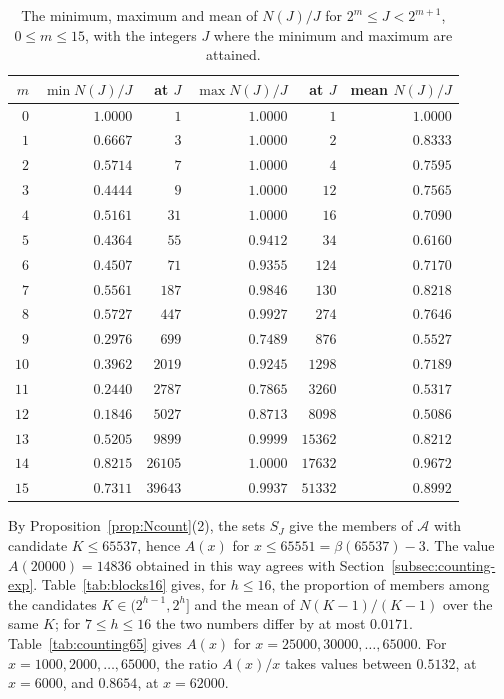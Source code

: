 \documentclass[11pt]{amsart}
\theoremstyle{definition}
\begin{document}
\begin{table}[H]
\centering
\caption{The minimum, maximum and mean of $N(J)/J$ for $2^m\le J<2^{m+1}$, $0\le m\le15$, with the integers $J$ where the minimum and maximum are attained.}
\label{tab:NJ}
\begin{tabular}{rrrrrr}
\toprule
$m$ & $\min N(J)/J$ & at $J$ & $\max N(J)/J$ & at $J$ & mean $N(J)/J$\\
\midrule
$0$ & $1.0000$ & $1$ & $1.0000$ & $1$ & $1.0000$\\
$1$ & $0.6667$ & $3$ & $1.0000$ & $2$ & $0.8333$\\
$2$ & $0.5714$ & $7$ & $1.0000$ & $4$ & $0.7595$\\
$3$ & $0.4444$ & $9$ & $1.0000$ & $12$ & $0.7565$\\
$4$ & $0.5161$ & $31$ & $1.0000$ & $16$ & $0.7090$\\
$5$ & $0.4364$ & $55$ & $0.9412$ & $34$ & $0.6160$\\
$6$ & $0.4507$ & $71$ & $0.9355$ & $124$ & $0.7170$\\
$7$ & $0.5561$ & $187$ & $0.9846$ & $130$ & $0.8218$\\
$8$ & $0.5727$ & $447$ & $0.9927$ & $274$ & $0.7646$\\
$9$ & $0.2976$ & $699$ & $0.7489$ & $876$ & $0.5527$\\
$10$ & $0.3962$ & $2019$ & $0.9245$ & $1298$ & $0.7189$\\
$11$ & $0.2440$ & $2787$ & $0.7865$ & $3260$ & $0.5317$\\
$12$ & $0.1846$ & $5027$ & $0.8713$ & $8098$ & $0.5086$\\
$13$ & $0.5205$ & $9899$ & $0.9999$ & $15362$ & $0.8212$\\
$14$ & $0.8215$ & $26105$ & $1.0000$ & $17632$ & $0.9672$\\
$15$ & $0.7311$ & $39643$ & $0.9937$ & $51332$ & $0.8992$\\
\bottomrule
\end{tabular}
\end{table}

By Proposition~\ref{prop:Ncount}(2), the sets $S_J$ give the members of $\mathcal{A}$ with candidate $K\le65537$, hence $A(x)$ for $x\le65551=\beta(65537)-3$. The value $A(20000)=14836$ obtained in this way agrees with Section~\ref{subsec:counting-exp}. Table~\ref{tab:blocks16} gives, for $h\le16$, the proportion of members among the candidates $K\in(2^{h-1},2^h]$ and the mean of $N(K-1)/(K-1)$ over the same $K$; for $7\le h\le16$ the two numbers differ by at most $0.0171$. Table~\ref{tab:counting65} gives $A(x)$ for $x=25000,30000,\dots,65000$. For $x=1000,2000,\dots,65000$, the ratio $A(x)/x$ takes values between $0.5132$, at $x=6000$, and $0.8654$, at $x=62000$.
\end{document}
